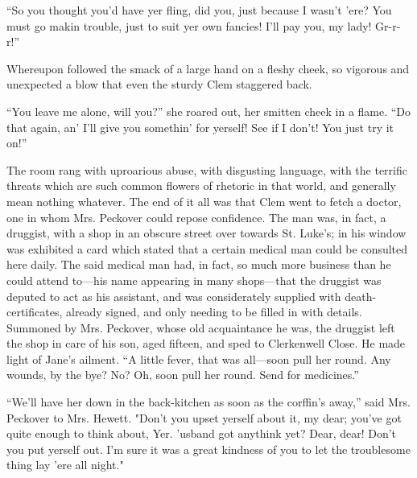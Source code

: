 ``So you thought you'd have yer fling, did you, just because I wasn't
'ere? You must go makin trouble, just to suit yer own fancies! I'll pay
you, my lady! Gr-r-r!''

Whereupon followed the smack of a large hand on a fleshy cheek, so
vigorous and unexpected a blow that even the sturdy Clem staggered back.

``You leave me alone, will you?'' she roared out, her smitten cheek in a
flame. ``Do that again, an' I'll give you somethin' for yerself! See if
I don't! You just try it on!''

The room rang with uproarious abuse, with disgusting language, with the
terrific threats which are such common flowers of rhetoric in that
world, and generally mean nothing whatever. The end of it all was that
Clem went to fetch a doctor, one in whom Mrs. Peckover could repose
confidence. The man was, in fact, a druggist, with a shop in an obscure
street over towards St. Luke's; in {\protect\hypertarget{95}{}{}}his
window was exhibited a card which stated that a certain medical man
could be consulted here daily. The said medical man had, in fact, so
much more business than he could attend to---his name appearing in many
shops---that the druggist was deputed to act as his assistant, and was
considerately supplied with death- certificates, already signed, and
only needing to be filled in with details. Summoned by Mrs. Peckover,
whose old acquaintance he was, the druggist left the shop in care of his
son, aged fifteen, and sped to Clerkenwell Close. He made light of
Jane's ailment. ``A little fever, that was all---soon pull her round.
Any wounds, by the bye? No? Oh, soon pull her round. Send for
medicines.''

``We'll have her down in the back-kitchen as soon as the corffin's
away,'' said Mrs. Peckover to Mrs. Hewett. "Don't you upset yerself
about it, my dear; you've got quite enough to think about, Yer. 'usband
got anythink yet? Dear, dear! Don't you put yerself out. I'm sure it was
a great {\protect\hypertarget{96}{}{}}kindness of you to let the
troublesome thing lay 'ere all night."

